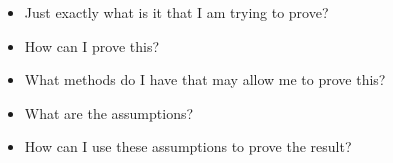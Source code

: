 \begin{enumerate}
\begin{itemize}
\item Just exactly what is it that I am trying to prove?
\item How can I prove this?
\item What methods do I have that may allow me to prove this?
\item What are the assumptions?
\item How can I use these assumptions to prove the result?
\end{itemize}
%
%

\end{enumerate}
